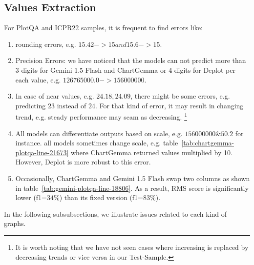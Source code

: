 \documentclass[
	letterpaper, %
]{jdf}
\begin{document}
\subsection{Values Extraction}\label{ssect:values-extraction}
For PlotQA and ICPR22 samples, it is frequent to find errors like:
\begin{enumerate}
     \item rounding errors, e.g. $15.42->15 and 15.6->15$.
     \item Precision Errors: we have noticed that the models can not predict more than 3 digits for Gemini 1.5 Flash and ChartGemma or 4 digits for Deplot per each value, e.g. $126765000.0->156000000$.
     \item In case of near values, e.g. $24.18, 24.09$, there might be some errors, e.g. predicting $23$ instead of $24$.
       For that kind of error, it may result in changing trend, e.g. steady performance may seam as decreasing.
       \footnote{It is worth noting that we have not seen cases where increasing is replaced by decreasing trends or vice versa in our Test-Sample.}
       \item All models can differentiate outputs based on scale, e.g. $156000000 \& 50.2$ for instance.
all models sometimes change scale, e.g. table~\ref{tab:chartgemma-plotqa-line-21673} where ChartGemma returned values multiplied by 10.
However, Deplot is more robust to this error.
       \item Occasionally, ChartGemma and Gemini 1.5 Flash swap two columns as shown in table~\ref{tab:gemini-plotqa-line-18806}.
         As a result, RMS score is significantly lower (f1=$34\%$) than its fixed version (f1=$83\%$).
       \end{enumerate}

       In the following subsubsections, we illustrate issues related to each kind of graphs.
\end{document}
